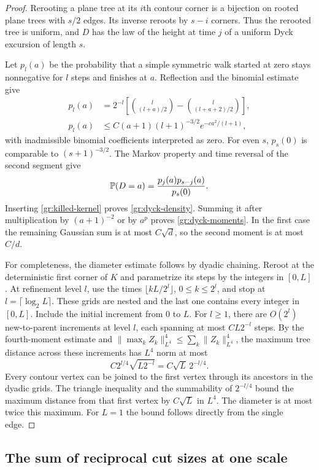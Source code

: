 \begin{proof}
Rerooting a plane tree at its $i$th contour corner is a bijection on
rooted plane trees with $s/2$ edges.  Its inverse reroots by $s-i$
corners.  Thus the rerooted tree is uniform, and $D$ has the law of
the height at time $j$ of a uniform Dyck excursion of length $s$.

Let $p_l(a)$ be the probability that a simple symmetric walk started
at zero stays nonnegative for $l$ steps and finishes at $a$.
Reflection and the binomial estimate give
\begin{align}
 p_l(a)
 &=2^{-l}\left[
       \binom{l}{(l+a)/2}-\binom{l}{(l+a+2)/2}\right],
       \label{gr:killed-kernel}\\
 p_l(a)&\leq C(a+1)(l+1)^{-3/2}
                         e^{-ca^2/(l+1)},\nonumber
\end{align}
with inadmissible binomial coefficients interpreted as zero.
For even $s$, $p_s(0)$ is comparable to $(s+1)^{-3/2}$.
The Markov property and time reversal of the second segment give
\[
 \P(D=a)=\frac{p_j(a)p_{s-j}(a)}{p_s(0)}.
\]
Inserting \eqref{gr:killed-kernel} proves
\eqref{gr:dyck-density}.  Summing it after multiplication by
$(a+1)^{-2}$ or by $a^p$ proves
\eqref{gr:dyck-moments}.  In the first case the remaining Gaussian
sum is at most $C\sqrt d$, so the second moment is at most $C/d$.

For completeness, the diameter estimate follows by dyadic chaining.
Reroot at the deterministic first corner of $K$ and parametrize its
steps by the integers in $[0,L]$.  At refinement level $l$, use the
times $\lfloor kL/2^l\rfloor$, $0\leq k\leq2^l$, and stop at
$l=\lceil\log_2L\rceil$.  These grids are nested and the last one
contains every integer in $[0,L]$.  Include the initial increment
from $0$ to $L$.  For $l\geq1$, there are $O(2^l)$ new-to-parent
increments at level $l$, each spanning at most $C L2^{-l}$ steps.
By the fourth-moment estimate and
$\|\max_k Z_k\|_{L^4}^4\leq\sum_k\|Z_k\|_{L^4}^4$, the maximum
tree distance across these increments has $L^4$ norm at most
\[
 C2^{l/4}\sqrt{L2^{-l}}=C\sqrt L\,2^{-l/4}.
\]
Every contour vertex can be joined to the first vertex through its
ancestors in the dyadic grids.  The triangle inequality and the
summability of $2^{-l/4}$ bound the maximum distance from that first
vertex by $C\sqrt L$ in $L^4$.  The diameter is at most twice this
maximum.  For $L=1$ the bound follows directly from the single edge.
\end{proof}

\subsection{The sum of reciprocal cut sizes at one scale}

